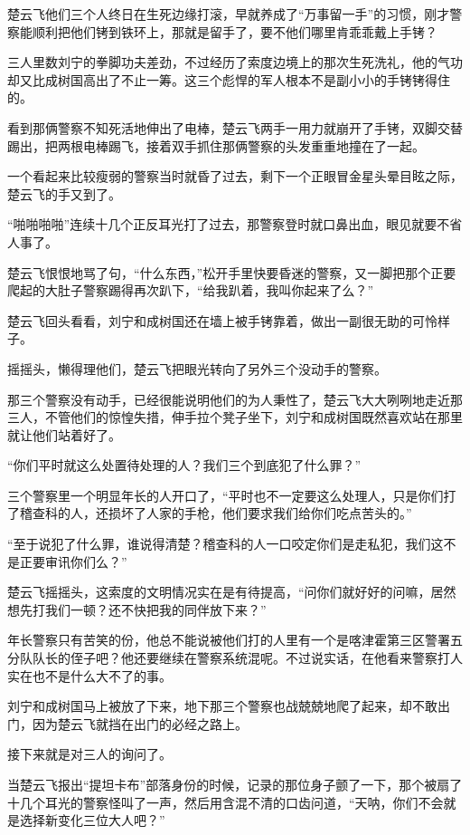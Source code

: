 楚云飞他们三个人终日在生死边缘打滚，早就养成了“万事留一手”的习惯，刚才警察能顺利把他们铐到铁环上，那就是留手了，要不他们哪里肯乖乖戴上手铐？

三人里数刘宁的拳脚功夫差劲，不过经历了索度边境上的那次生死洗礼，他的气功却又比成树国高出了不止一筹。这三个彪悍的军人根本不是副小小的手铐铐得住的。

看到那俩警察不知死活地伸出了电棒，楚云飞两手一用力就崩开了手铐，双脚交替踢出，把两根电棒踢飞，接着双手抓住那俩警察的头发重重地撞在了一起。

一个看起来比较瘦弱的警察当时就昏了过去，剩下一个正眼冒金星头晕目眩之际，楚云飞的手又到了。

“啪啪啪啪”连续十几个正反耳光打了过去，那警察登时就口鼻出血，眼见就要不省人事了。

楚云飞恨恨地骂了句，“什么东西，”松开手里快要昏迷的警察，又一脚把那个正要爬起的大肚子警察踢得再次趴下，“给我趴着，我叫你起来了么？”

楚云飞回头看看，刘宁和成树国还在墙上被手铐靠着，做出一副很无助的可怜样子。

摇摇头，懒得理他们，楚云飞把眼光转向了另外三个没动手的警察。

那三个警察没有动手，已经很能说明他们的为人秉性了，楚云飞大大咧咧地走近那三人，不管他们的惊惶失措，伸手拉个凳子坐下，刘宁和成树国既然喜欢站在那里就让他们站着好了。

“你们平时就这么处置待处理的人？我们三个到底犯了什么罪？”

三个警察里一个明显年长的人开口了，“平时也不一定要这么处理人，只是你们打了稽查科的人，还损坏了人家的手枪，他们要求我们给你们吃点苦头的。”

“至于说犯了什么罪，谁说得清楚？稽查科的人一口咬定你们是走私犯，我们这不是正要审讯你们么？”

楚云飞摇摇头，这索度的文明情况实在是有待提高，“问你们就好好的问嘛，居然想先打我们一顿？还不快把我的同伴放下来？”

年长警察只有苦笑的份，他总不能说被他们打的人里有一个是喀津霍第三区警署五分队队长的侄子吧？他还要继续在警察系统混呢。不过说实话，在他看来警察打人实在也不是什么大不了的事。

刘宁和成树国马上被放了下来，地下那三个警察也战兢兢地爬了起来，却不敢出门，因为楚云飞就挡在出门的必经之路上。

接下来就是对三人的询问了。

当楚云飞报出“提坦卡布”部落身份的时候，记录的那位身子颤了一下，那个被扇了十几个耳光的警察怪叫了一声，然后用含混不清的口齿问道，“天呐，你们不会就是选择新变化三位大人吧？”

